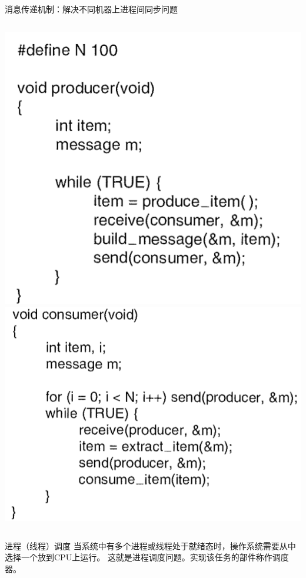 \documentclass[xcolor=svgnames]{beamer}
\begin{document}
\begin{CJK*}{UTF8}{gbsn}
\begin{frame}{消息传递机制：解决不同机器上进程间同步问题}
\begin{columns}[b]
\includegraphics[width=1.0\textwidth]{msgprod.png}
\includegraphics[width=1.0\textwidth]{msgcons.png}
\end{columns}%
\end{frame}

\begin{frame}{进程（线程）调度}
当系统中有多个进程或线程处于就绪态时，操作系统需要从中选择一个放到CPU上运行。
这就是进程调度问题。实现该任务的部件称作调度器。
\end{frame}


\end{CJK*}
\end{document}
